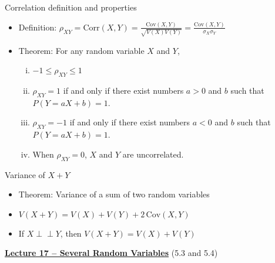 \documentclass{article}
\newcommand{\bu}[1]{\textbf{\ul{#1}}}				%
\newcommand{\ind}{\perp \!\!\! \perp}			%
\newcommand{\cov}[1]{\mathrm{Cov}(#1)}		%
\newcommand{\corr}[1]{\mathrm{Corr}(#1)}		%
\begin{document}
Correlation definition and properties
\begin{itemize}
    \item Definition: $\displaystyle \rho_{XY} = \corr{X,Y} = \frac{\cov{X,Y}}{\sqrt{V(X) V(Y)}} = \frac{\cov{X,Y}}{\sigma_X \sigma_Y}$
    \item Theorem: For any random variable $X$ and $Y$,
    \begin{enumerate}[i)]
        \item $-1 \le \rho_{XY} \le 1$ 
        \item $\rho_{XY} = 1$ if and only if there exist numbers $a > 0$ and $b$ such that $P(Y = aX + b) = 1$.
        \item $\rho_{XY} = -1$ if and only if there exist numbers $a < 0$ and $b$ such that $P(Y = aX + b) = 1$. 
        \item When $\rho_{XY} = 0$, $X$ and $Y$ are uncorrelated.
    \end{enumerate}
\end{itemize}\bigskip

Variance of $X + Y$
\begin{itemize}
    \item Theorem: Variance of a sum of two random variables
    \item[] $V(X + Y) = V(X) + V(Y) + 2 \,\cov{X,Y}$
    \item[] If $X \ind Y$, then $V(X + Y) = V(X) + V(Y)$
\end{itemize}\bigskip

\newpage

{\large \bu{Lecture 17 -- Several Random Variables}} (5.3 and 5.4)\bigskip
\end{document}
